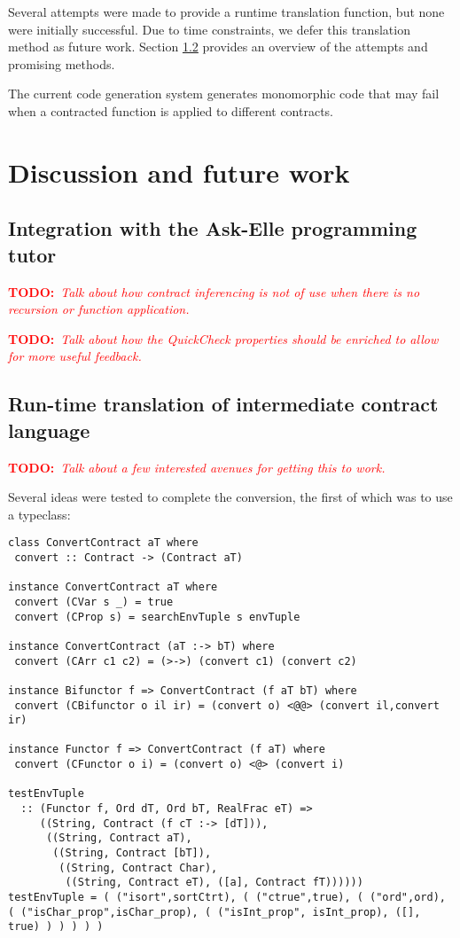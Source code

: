 \documentclass[10pt]{report}
\newcommand{\annotate}[3]{
	\begin{scriptsize}
	\textcolor{#1}{\textbf{#2}~\textit{#3}}
	\end{scriptsize}\newline}
\newcommand{\todo}[1]{\annotate{red} {TODO:} {#1}}
\begin{document}
Several attempts were made to provide a runtime translation function, but none were initially successful.
Due to time constraints, we defer this translation method as future work.
Section \ref{futurework:runtimetranslation} provides an overview of the attempts and promising methods.

The current code generation system generates monomorphic code that may fail when a contracted function is applied to different contracts.
\chapter{Discussion and future work}
\label{futurework}

\section{Integration with the Ask-Elle programming tutor}

\todo{Talk about how contract inferencing is not of use when there is no recursion or function application.}

\todo{Talk about how the QuickCheck properties should be enriched to allow for more useful feedback.}



\section{Run-time translation of intermediate contract language}
\label{futurework:runtimetranslation}
\todo{Talk about a few interested avenues for getting this to work.}


Several ideas were tested to complete the conversion, the first of which was to use a typeclass:

\begin{lstlisting}[caption=Attempt at using a typeclass to recover the extra type information.]
class ConvertContract aT where
 convert :: Contract -> (Contract aT)

instance ConvertContract aT where
 convert (CVar s _) = true
 convert (CProp s) = searchEnvTuple s envTuple

instance ConvertContract (aT :-> bT) where
 convert (CArr c1 c2) = (>->) (convert c1) (convert c2)

instance Bifunctor f => ConvertContract (f aT bT) where
 convert (CBifunctor o il ir) = (convert o) <@@> (convert il,convert ir)

instance Functor f => ConvertContract (f aT) where
 convert (CFunctor o i) = (convert o) <@> (convert i)
 
testEnvTuple
  :: (Functor f, Ord dT, Ord bT, RealFrac eT) =>
     ((String, Contract (f cT :-> [dT])),
      ((String, Contract aT),
       ((String, Contract [bT]),
        ((String, Contract Char),
         ((String, Contract eT), ([a], Contract fT))))))
testEnvTuple = ( ("isort",sortCtrt), ( ("ctrue",true), ( ("ord",ord), ( ("isChar_prop",isChar_prop), ( ("isInt_prop", isInt_prop), ([], true) ) ) ) ) )
\end{lstlisting}
\end{document}

